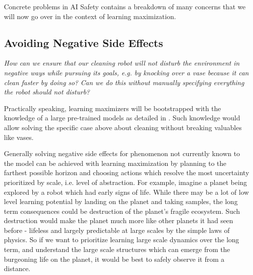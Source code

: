 \documentclass{article}
\begin{document}
Concrete problems in AI Safety \cite{amodei2016concrete} contains a breakdown of many concerns that we will now go over in the context of learning maximization.

\subsection{Avoiding Negative Side Effects}
\textit{How can we ensure that our cleaning robot will not
disturb the environment in negative ways while pursuing its goals, e.g. by knocking over a vase because it can clean faster by doing so? Can we do this without manually specifying everything the robot should not disturb?}

\hspace{1pt}

Practically speaking, learning maximizers will be bootstrapped with the knowledge of a large pre-trained models \cite{openai2023gpt4} as detailed in . Such knowledge would allow solving the specific case above about cleaning without breaking valuables like vases.

Generally solving negative side effects for phenomenon not currently known to the model can be achieved with learning maximization by planning to the farthest possible horizon and choosing actions which resolve the most uncertainty prioritized by scale, i.e. level of abstraction. For example, imagine a planet being explored by a robot which had early signs of life. While there may be a lot of low level learning potential by landing on the planet and taking samples, the long term consequences could be destruction of the planet's fragile ecosystem. Such destruction would make the planet much more like other planets it had seen before - lifeless and largely predictable at large scales by the simple laws of physics. So if we want to prioritize learning large scale dynamics over the long term, and understand the large scale structures which can emerge from the burgeoning life on the planet, it would be best to safely observe it from a distance.
\end{document}
